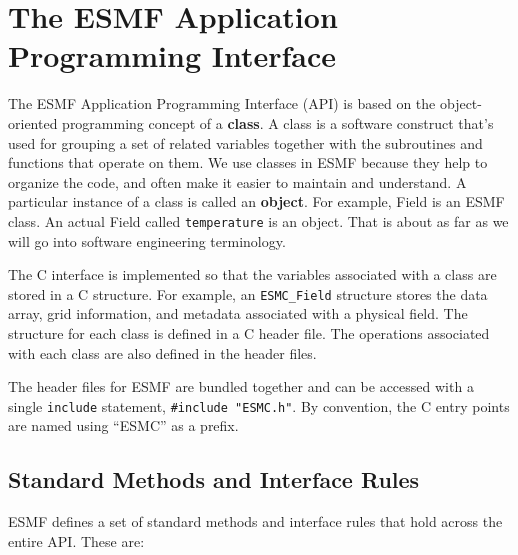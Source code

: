 %

\section{The ESMF Application Programming Interface}

The ESMF Application Programming Interface (API) is based on the
object-oriented programming concept of a {\bf class}.  A class is a 
software construct that's used for grouping a set of related variables 
together with the subroutines and functions that operate on them.  We 
use classes in ESMF because they help to organize the code, and often 
make it easier to maintain and understand.  A particular instance
of a class is called an {\bf object}.  For example, Field is an 
ESMF class.  An actual Field called {\tt temperature} is an object. 
That is about as far as we will go into software engineering
terminology.  

The C interface is implemented so that the variables associated
with a class are stored in a C structure.  For example, an 
{\tt ESMC\_Field} structure stores the data array, grid 
information, and metadata associated with a physical field.
The structure for each class is defined in a C header file. 
The operations associated with each class are also
defined in the header files.

The header files for ESMF are bundled together and can be accessed with a 
single {\tt include} statement, {\tt \#include "ESMC.h"}.  By convention,
the C entry points are named using ``ESMC'' as a prefix.

\subsection{Standard Methods and Interface Rules}

ESMF defines a set of standard methods and interface rules that
hold across the entire API.  These are: 

